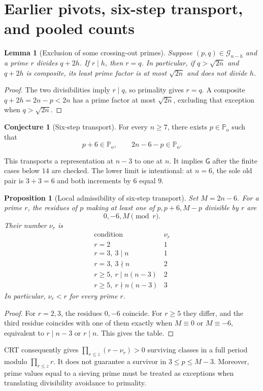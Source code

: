 \documentclass[11pt,a4paper]{article}
\newtheorem{proposition}[theorem]{Proposition}
\newtheorem{lemma}[theorem]{Lemma}
\theoremstyle{definition}
\newtheorem{conjecture}[theorem]{Conjecture}
\theoremstyle{remark}
\newcommand{\Po}{\mathbb P_{\mathrm{o}}}
\newcommand{\G}{\mathcal G}
\newcommand{\GB}{\mathsf G}
\begin{document}
\section{Earlier pivots, six-step transport, and pooled counts}
\begin{lemma}[Exclusion of some crossing-out primes]\label{lem:transportfactor}
Suppose $(p,q)\in\G_{n-h}$ and a prime $r$ divides $q+2h$. If $r\mid h$, then $r=q$. In particular, if $q>\sqrt{2n}$ and $q+2h$ is composite, its least prime factor is at most $\sqrt{2n}$ and does not divide $h$.
\end{lemma}
\begin{proof}
The two divisibilities imply $r\mid q$, so primality gives $r=q$. A composite $q+2h=2n-p<2n$ has a prime factor at most $\sqrt{2n}$, excluding that exception when $q>\sqrt{2n}$.
\end{proof}

\begin{conjecture}[Six-step transport]\label{conj:six}
For every $n\ge7$, there exists $p\in\Po$ such that
\[
 p+6\in\Po,\qquad 2n-6-p\in\Po.
\]
\end{conjecture}
This transports a representation at $n-3$ to one at $n$. It implies $\GB$ after the finite cases below $14$ are checked. The lower limit is intentional: at $n=6$, the sole old pair is $3+3=6$ and both increments by $6$ equal $9$.

\begin{proposition}[Local admissibility of six-step transport]
Set $M=2n-6$. For a prime $r$, the residues of $p$ making at least one of $p,p+6,M-p$ divisible by $r$ are
\[
 0,-6,M\pmod r.
\]
Their number $\nu_r$ is
\[
\begin{array}{c|c}
\text{condition}&\nu_r\\\hline
r=2&1\\
r=3,\ 3\mid n&1\\
r=3,\ 3\nmid n&2\\
r\ge5,\ r\mid n(n-3)&2\\
r\ge5,\ r\nmid n(n-3)&3
\end{array}
\]
In particular, $\nu_r<r$ for every prime $r$.
\end{proposition}
\begin{proof}
For $r=2,3$, the residues $0,-6$ coincide. For $r\ge5$ they differ, and the third residue coincides with one of them exactly when $M\equiv0$ or $M\equiv-6$, equivalent to $r\mid n-3$ or $r\mid n$. This gives the table.
\end{proof}
CRT consequently gives $\prod_{r\le z}(r-\nu_r)>0$ surviving classes in a full period modulo $\prod_{r\le z}r$. It does not guarantee a survivor in $3\le p\le M-3$. Moreover, prime values equal to a sieving prime must be treated as exceptions when translating divisibility avoidance to primality.
\end{document}
